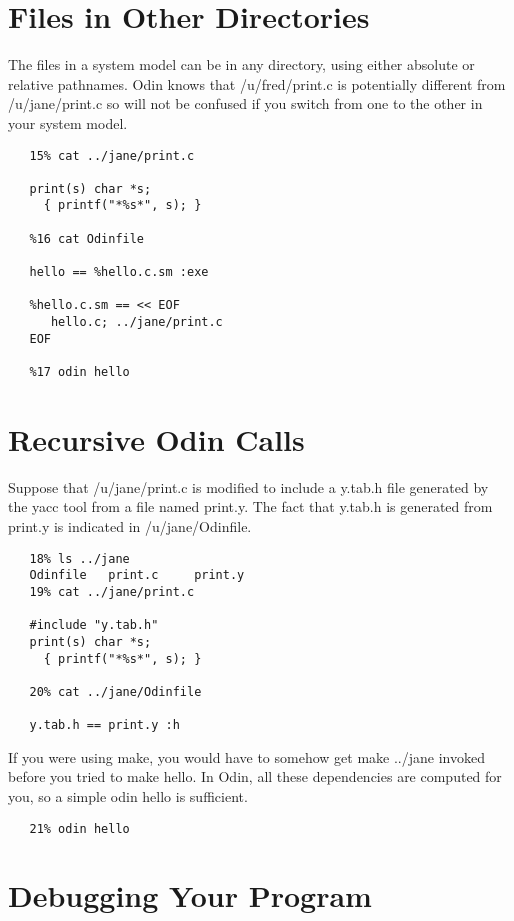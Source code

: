\section{Files in Other Directories}

The files in a system model can be in any directory, using either
absolute or relative pathnames.  Odin knows that {\ex /u/fred/print.c} is
potentially different from {\ex /u/jane/print.c} so will not be confused if
you switch from one to the other in your system model.
\begin{verbatim}
   15% cat ../jane/print.c

   print(s) char *s;
     { printf("*%s*", s); }

   %16 cat Odinfile

   hello == %hello.c.sm :exe

   %hello.c.sm == << EOF
      hello.c; ../jane/print.c
   EOF

   %17 odin hello
\end{verbatim}


\section {Recursive Odin Calls}

Suppose that {\ex /u/jane/print.c} is modified to include a {\ex y.tab.h}
file generated by the {\ex yacc} tool from a file named {\ex print.y}.
The fact that {\ex y.tab.h} is generated from {\ex print.y} is indicated
in {\ex /u/jane/Odinfile}.
\begin{verbatim}
   18% ls ../jane
   Odinfile   print.c     print.y
   19% cat ../jane/print.c

   #include "y.tab.h"
   print(s) char *s;
     { printf("*%s*", s); }

   20% cat ../jane/Odinfile

   y.tab.h == print.y :h
\end{verbatim}
If you were using {\ex make}, you would have to somehow get {\ex make ../jane}
invoked before you tried to {\ex make hello}.  In Odin, all these dependencies
are computed for you, so a simple {\ex odin hello} is sufficient.
\begin{verbatim}
   21% odin hello
\end{verbatim}


\section{Debugging Your Program}

